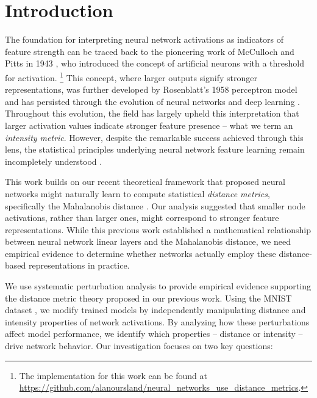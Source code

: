 \section{Introduction}

The foundation for interpreting neural network activations as indicators of feature strength can be traced back to the pioneering work of McCulloch and Pitts in 1943 \citep{mcculloch1943logical}, who introduced the concept of artificial neurons with a threshold for activation. \footnote{The implementation for this work can be found at \url{https://github.com/alanoursland/neural_networks_use_distance_metrics}.} This concept, where larger outputs signify stronger representations, was further developed by Rosenblatt's 1958 perceptron model \citep{rosenblatt1958perceptron} and has persisted through the evolution of neural networks and deep learning \citep{schmidhuber2015deep}. Throughout this evolution, the field has largely upheld this interpretation that larger activation values indicate stronger feature presence -- what we term an \emph{intensity metric}. However, despite the remarkable success achieved through this lens, the statistical principles underlying neural network feature learning remain incompletely understood \citep{lipton2018mythos}.

This work builds on our recent theoretical framework \citep{oursland2024interpreting} that proposed neural networks might naturally learn to compute statistical \emph{distance metrics}, specifically the Mahalanobis distance \citep{mahalanobis1936generalized}. Our analysis suggested that smaller node activations, rather than larger ones, might correspond to stronger feature representations. While this previous work established a mathematical relationship between neural network linear layers and the Mahalanobis distance, we need empirical evidence to determine whether networks actually employ these distance-based representations in practice.

We use systematic perturbation analysis \citep{szegedy2013intriguing, goodfellow2014explaining} to provide empirical evidence supporting the distance metric theory proposed in our previous work. Using the MNIST dataset \citep{lecun1998gradient}, we modify trained models by independently manipulating distance and intensity properties of network activations. By analyzing how these perturbations affect model performance, we identify which properties -- distance or intensity -- drive network behavior. Our investigation focuses on two key questions:


